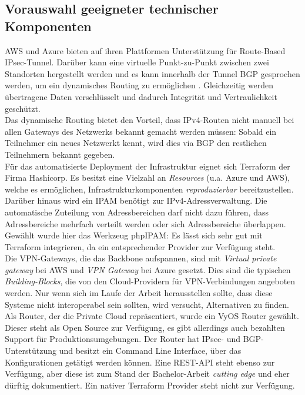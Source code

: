 \subsection{Vorauswahl geeigneter technischer Komponenten}
AWS und Azure bieten auf ihren Plattformen Unterstützung für Route-Based IPsec-Tunnel\cite[S.32]{awsvpn2021}. Darüber kann eine virtuelle Punkt-zu-Punkt zwischen zwei Standorten hergestellt werden und es kann innerhalb der Tunnel BGP gesprochen werden, um ein dynamisches Routing zu ermöglichen\cite[S. 18]{AlShawi2020} \cite[S. 74-79]{Toroman2019}. Gleichzeitig werden übertragene Daten verschlüsselt und dadurch Integrität und Vertraulichkeit geschützt.\\
Das dynamische Routing bietet den Vorteil, dass IPv4-Routen nicht manuell bei allen Gateways des Netzwerks bekannt gemacht werden müssen: Sobald ein Teilnehmer ein neues Netzwerkt kennt, wird dies via BGP den restlichen Teilnehmern bekannt gegeben.\\
Für das automatisierte \gls{Deployment} der Infrastruktur eignet sich Terraform der Firma Hashicorp. Es besitzt eine Vielzahl an \textit{Resources} (u.a. Azure und AWS), welche es ermöglichen, Infrastrukturkomponenten \textit{reproduzierbar} bereitzustellen.\\
Darüber hinaus wird ein IPAM benötigt zur IPv4-Adressverwaltung. Die automatische Zuteilung von Adressbereichen darf nicht dazu führen, dass Adressbereiche mehrfach verteilt werden oder sich Adressbereiche überlappen. Gewählt wurde hier das Werkzeug phpIPAM\cite{phpipam2020}: Es lässt sich sehr gut mit Terraform integrieren, da ein entsprechender Provider zur Verfügung steht\cite{phpipamtf2020}.\\
Die VPN-Gateways, die das Backbone aufspannen, sind mit \textit{Virtual private gateway} bei AWS und \textit{VPN Gateway} bei Azure gesetzt. Dies sind die typischen \textit{Building-Blocks}, die von den Cloud-Providern für VPN-Verbindungen angeboten werden. Nur wenn sich im Laufe der Arbeit herausstellen sollte, dass diese Systeme nicht interoperabel sein sollten, wird versucht, Alternativen zu finden.\\
Als Router, der die Private Cloud repräsentiert, wurde ein VyOS Router gewählt. Dieser steht als Open Source zur Verfügung, es gibt allerdings auch bezahlten Support für Produktionsumgebungen. Der Router hat IPsec- und BGP-Unterstützung und besitzt ein Command Line Interface, über das Konfigurationen getätigt werden können. Eine REST-API steht ebenso zur Verfügung, aber diese ist zum Stand der Bachelor-Arbeit \textit{cutting edge} und eher dürftig dokumentiert\cite{vyosapi2021}. Ein nativer Terraform Provider steht nicht zur Verfügung.

